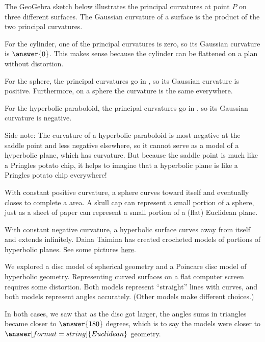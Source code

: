 \documentclass{ximera}
\begin{document}
\begin{problem}
The GeoGebra sketch below illustrates the principal curvatures at point $P$ on three different surfaces.  The Gaussian curvature of a surface is the product of the two principal curvatures.  
\begin{center}
\end{center}

For the cylinder, one of the principal curvatures is zero, so its Gaussian curvature is $\answer{0}$.  This makes sense because the cylinder can be flattened on a plan without distortion.  

For the sphere, the principal curvatures go in , so its Gaussian curvature is positive.  Furthermore, on a sphere the curvature is the same everywhere.  
 
For the hyperbolic paraboloid, the principal curvatures go in , so its Gaussian curvature is 
negative.  

Side note: The curvature of a hyperbolic paraboloid is most negative at the saddle point and less negative elsewhere, so it cannot serve as a model of a hyperbolic plane, which has  curvature.  But because the saddle point is much like a Pringles potato chip, it helps to imagine that a hyperbolic plane is like a Pringles potato chip everywhere!  
\end{problem}

\begin{problem}
With constant positive curvature, a sphere curves toward itself and eventually closes to complete a  area.  A skull cap can represent a small portion of a sphere, just as a sheet of paper can represent a small portion of a (flat) Euclidean plane.  

With constant negative curvature, a hyperbolic surface curves away from itself and extends infinitely.  Daina Taimina has created crocheted models of portions of hyperbolic planes.  See some pictures \href{https://www.theiff.org/oexhibits/oe1e.html}{here}.  

We explored a disc model of spherical geometry and a Poincare disc model of hyperbolic geometry.  Representing curved surfaces on a flat computer screen requires some distortion.  Both models represent ``straight'' lines with curves, and both models represent angles accurately.  (Other models make different choices.)

In both cases, we saw that as the disc got larger, the angles sums in triangles became closer to $\answer{180}$ degrees, which is to say the models were closer to $\answer[format=string]{Euclidean}$ geometry.  
\end{problem}
\end{document}

